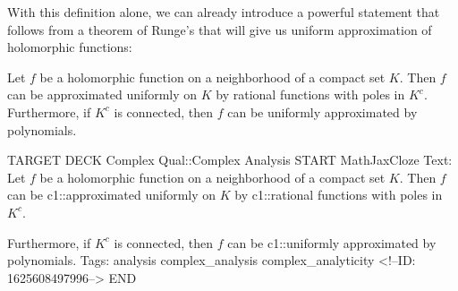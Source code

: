 \documentclass{memoir}
\begin{document}
With this definition alone, we can already introduce a powerful statement that follows from a theorem of Runge's that will give us uniform approximation of holomorphic functions:

\begin{thm}
	Let \(f\) be a holomorphic function on a neighborhood of a compact set \(K\). Then \(f\) can be approximated uniformly on \(K\) by rational functions with poles in \(K^{c}\).\\

	Furthermore, if \(K^{c}\) is connected, then \(f\) can be uniformly approximated by polynomials.
\end{thm}

\begin{anki}
TARGET DECK
Complex Qual::Complex Analysis
START
MathJaxCloze
Text: Let \(f\) be a holomorphic function on a neighborhood of a compact set \(K\). Then \(f\) can be {{c1::approximated uniformly}} on \(K\) by {{c1::rational functions with poles in \(K^{c}\)}}.

Furthermore, if \(K^{c}\) is connected, then \(f\) can be {{c1::uniformly approximated by polynomials}}.
Tags: analysis complex_analysis complex_analyticity
<!--ID: 1625608497996-->
END
\end{anki}


\end{document}

